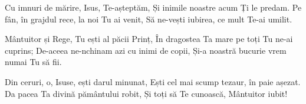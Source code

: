 \beginverse
Cu imnuri de mărire, Isus, Te-așteptăm,
Și inimile noastre acum Ți le predam.
Pe fân, în grajdul rece, la noi Tu ai venit,
Să ne-vești iubirea, ce mult Te-ai umilit.
\endverse

\beginverse
Mântuitor și Rege, Tu ești al păcii Prinț,
În dragostea Ta mare pe toți Tu ne-ai cuprins;
De-aceea ne-nchinam azi cu inimi de copii,
Și-a noastră bucurie vrem numai Tu să fii.
\endverse

\beginverse
Din ceruri, o, Isuse, ești darul minunat,
Ești cel mai scump tezaur, în paie așezat.
Da pacea Ta divină pământului robit,
Și toți să Te cunoască, Mântuitor iubit!
\endverse
\endsong